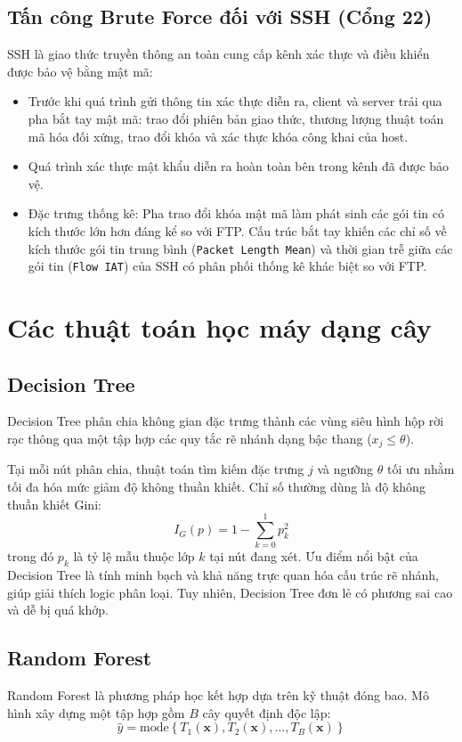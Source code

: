 \subsection{Tấn công Brute Force đối với SSH (Cổng 22)}
SSH là giao thức truyền thông an toàn cung cấp kênh xác thực và điều khiển được bảo vệ bằng mật mã:
\begin{itemize}
    \item Trước khi quá trình gửi thông tin xác thực diễn ra, client và server trải qua pha bắt tay mật mã: trao đổi phiên bản giao thức, thương lượng thuật toán mã hóa đối xứng, trao đổi khóa và xác thực khóa công khai của host.
    \item Quá trình xác thực mật khẩu diễn ra hoàn toàn bên trong kênh đã được bảo vệ.
    \item Đặc trưng thống kê: Pha trao đổi khóa mật mã làm phát sinh các gói tin có kích thước lớn hơn đáng kể so với FTP. Cấu trúc bắt tay khiến các chỉ số về kích thước gói tin trung bình (\texttt{Packet Length Mean}) và thời gian trễ giữa các gói tin (\texttt{Flow IAT}) của SSH có phân phối thống kê khác biệt so với FTP.
\end{itemize}

\section{Các thuật toán học máy dạng cây}

\subsection{Decision Tree}
Decision Tree \cite{quinlan1986induction} phân chia không gian đặc trưng thành các vùng siêu hình hộp rời rạc thông qua một tập hợp các quy tắc rẽ nhánh dạng bậc thang ($x_j \le \theta$).

Tại mỗi nút phân chia, thuật toán tìm kiếm đặc trưng $j$ và ngưỡng $\theta$ tối ưu nhằm tối đa hóa mức giảm độ không thuần khiết. Chỉ số thường dùng là độ không thuần khiết Gini:
\begin{equation}
    I_G(p) = 1 - \sum_{k=0}^{1} p_k^2
\end{equation}
trong đó $p_k$ là tỷ lệ mẫu thuộc lớp $k$ tại nút đang xét. Ưu điểm nổi bật của Decision Tree là tính minh bạch và khả năng trực quan hóa cấu trúc rẽ nhánh, giúp giải thích logic phân loại. Tuy nhiên, Decision Tree đơn lẻ có phương sai cao và dễ bị quá khớp.

\subsection{Random Forest}
Random Forest \cite{breiman2001random} là phương pháp học kết hợp dựa trên kỹ thuật đóng bao. Mô hình xây dựng một tập hợp gồm $B$ cây quyết định độc lập:
\begin{equation}
    \hat{y} = \text{mode} \left\{ T_1(\mathbf{x}), T_2(\mathbf{x}), \dots, T_B(\mathbf{x}) \right\}
\end{equation}

